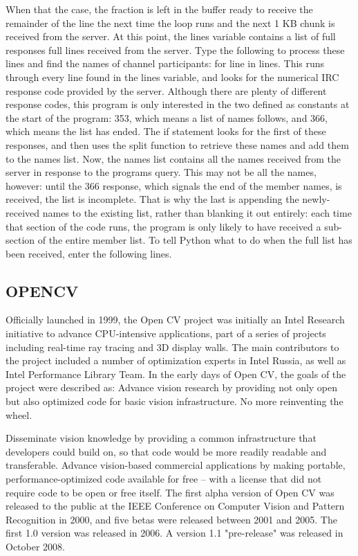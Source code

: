 When that the case, the fraction is left in the buffer ready to receive the remainder of the line the next time the loop runs and the next 1 KB chunk is received from the server. At this point, the lines variable contains a list of full responses full lines received from the server. Type the following to process these lines and find the names of channel participants: for line in lines.
This runs through every line found in the lines variable, and looks for the numerical IRC response code provided by the server. Although there are plenty of different response codes, this program is only interested in the two defined as constants at the start of the program: 353, which means a list of names follows, and 366, which means the list has ended. The if statement looks for the first of these responses, and then uses the split function to retrieve these names and add them to the names list. Now, the names list contains all the names received from the server in response to the programs query. This may not be all the names, however: until the 366 response, which signals the end of the member names, is received, the list is incomplete. That is why the last is appending the newly-received names to the existing list, rather than blanking it out entirely: each time that section of the code runs, the program is only likely to have received a sub-section of the entire member list. To tell Python what to do when the full list has been received, enter the following lines.
\subsection{OPENCV}
Officially launched in 1999, the Open CV project was initially an Intel Research initiative to advance CPU-intensive applications, part of a series of projects including real-time ray tracing and 3D display walls. The main contributors to the project included a number of optimization experts in Intel Russia, as well as Intel Performance Library Team. In the early days of Open CV, the goals of the project were described as:
Advance vision research by providing not only open but also optimized code for basic vision infrastructure. No more reinventing the wheel.

Disseminate vision knowledge by providing a common infrastructure that developers could build on, so that code would be more readily readable and transferable.
Advance vision-based commercial applications by making portable, performance-optimized code available for free – with a license that did not require code to be open or free itself.
The first alpha version of Open CV was released to the public at the IEEE Conference on Computer Vision and Pattern Recognition in 2000, and five betas were released between 2001 and 2005. The first 1.0 version was released in 2006. A version 1.1 "pre-release" was released in October 2008.

